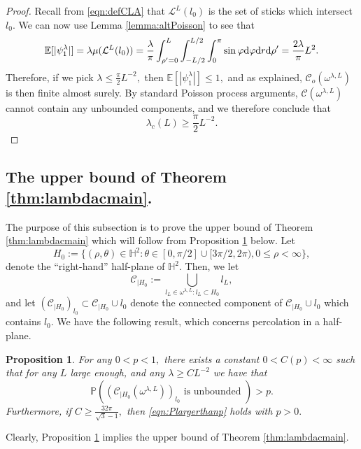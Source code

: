 \documentclass[a4paper,12pt]{article}
\newcommand{\BE}{{\mathbb{E}}}
\newcommand{\BH}{{\mathbb{H}}}
\newcommand{\BP}{{\mathbb{P}}}
\newcommand{\CC}{{\mathcal{C}}}
\newcommand{\CL}{{\mathcal{L}}}
\newcommand{\dd}{{\rm d}}
\newtheorem{proposition}[theorem]{Proposition}
\begin{document}
\begin{proof}
Recall from \eqref{eqn:defCLA} that $\CL^L(l_0)$ is the set of sticks which intersect 
$l_0.$ We can now use Lemma \ref{lemma:altPoisson} to see that 
\begin{equation} \label{eqn:Epsi}
\BE[|\psi^\lambda_1|] = \lambda\mu(\CL^L(l_0))
= \frac{\lambda}{\pi}\int_{\rho'=0}^L \int_{-L/2}^{L/2} \int_{0}^{\pi} 
\sin \varphi \dd \varphi \dd r \dd \rho'
=\frac{2\lambda }{\pi}L^2.    
\end{equation}
Therefore, if we pick $\lambda\leq \frac{\pi}{2}L^{-2},$ then $\BE[|\psi^\lambda_1|] \leq 1,$ 
and as explained, $\CC_o(\omega^{\lambda,L})$ is then finite almost surely.
By standard Poisson process arguments, $\CC(\omega^{\lambda,L})$ cannot contain any unbounded 
components, and we therefore conclude that 
\[
\lambda_c(L)\geq \frac{\pi}{2}L^{-2}.
\]
\end{proof}



\subsection{The upper bound of Theorem \ref{thm:lambdacmain}.}
The purpose of this subsection is to prove the upper bound of 
Theorem \ref{thm:lambdacmain} which will follow from Proposition 
\ref{prop:half-plane} below. Let 
\[
H_0:=\{(\rho,\theta)\in \BH^2: \theta \in[0,\pi/2]\cup [3\pi/2,2\pi), 0\leq \rho<\infty\},
\]
denote the ``right-hand'' half-plane of $\BH^2.$ Then, we let
\begin{equation} \label{eqn:defCH0}
\CC_{|H_0}:= \bigcup_{l_L\in \omega^{\lambda,L}: l_L\subset H_0} l_L,   
\end{equation}
and let $\left(\CC_{|H_0}\right)_{l_0}\subset \CC_{|H_0}\cup l_0$ denote the connected component of 
$\CC_{|H_0} \cup l_0$ which contains $l_0.$ We have the following result, which 
concerns
percolation in a half-plane. 
\begin{proposition} \label{prop:half-plane}
For any $0<p<1,$ there exists a constant $0<C(p)<\infty$ such that for any $L$ large enough, 
and any $\lambda \geq CL^{-2}$ we have that 
\begin{equation}\label{eqn:Plargerthanp}
 \BP\left(\left(\CC_{|H_0}(\omega^{\lambda,L})\right)_{l_0} \textrm{ is unbounded }\right)>p.   
\end{equation}
Furthermore, if $C\geq \frac{32 \pi}{\sqrt{3}-1},$ then 
\eqref{eqn:Plargerthanp} holds with $p>0.$
\end{proposition}
\noindent
Clearly, Proposition \ref{prop:half-plane} implies the upper bound of 
Theorem \ref{thm:lambdacmain}.
\end{document}
